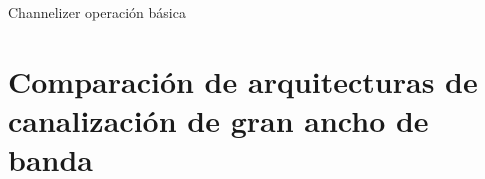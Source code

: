 \documentclass[ignorenonframetext,12pt]{beamer}
\begin{document}
\begin{frame}{Channelizer operación básica}
				\begin{center}
				\end{center}
								\begin{center}
								\end{center}
\end{frame}

\section{Comparación de arquitecturas de canalización de gran ancho de banda}
\end{document}
